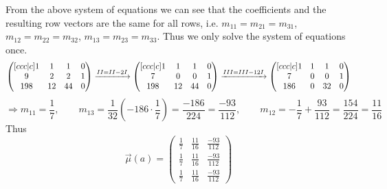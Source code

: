         From the above system of equations we can see that the coefficients and the resulting row vectors are the same for all rows, i.e. $m_{11} = m_{21} = m_{31}$, $m_{12} = m_{22} = m_{32}$, $m_{13} = m_{23} = m_{33}$. Thus we only solve the system of equations once.
        \[   \begin{pmatrix}[c c c | c]
                1 & 1 & 1 & 0 \\
                9 & 2 & 2 & 1 \\
                198 & 12 & 44 & 0 \\
            \end{pmatrix} 
            \xrightarrow{\rom{2} = \rom{2} - 2\rom{1}} 
            \begin{pmatrix}[c c c | c]
                1 & 1 & 1 & 0 \\
                7 & 0 & 0 & 1 \\
                198 & 12 & 44 & 0 \\
            \end{pmatrix} 
            \xrightarrow{\rom{3} = \rom{3} - 12\rom{1}} 
            \begin{pmatrix}[c c c | c]
                1 & 1 & 1 & 0 \\
                7 & 0 & 0 & 1 \\
                186 & 0 & 32 & 0 \\
            \end{pmatrix} 
        \] 
        \[ 
            \Rightarrow m_{11} = \frac{1}{7}, \qquad m_{13} = \frac{1}{32}(- 186 \cdot \frac{1}{7}) = \frac{-186}{224} = \frac{-93}{112}, \qquad m_{12} = - \frac{1}{7} + \frac{93}{112} = \frac{154}{224} = \frac{11}{16}
        \]
        Thus \[ \overrightarrow{\mu}(a) = 
            \begin{pmatrix}
                \frac{1}{7} & \frac{11}{16} & \frac{-93}{112} \\
                \frac{1}{7} & \frac{11}{16} & \frac{-93}{112} \\
                \frac{1}{7} & \frac{11}{16} & \frac{-93}{112}
            \end{pmatrix} \]
            
